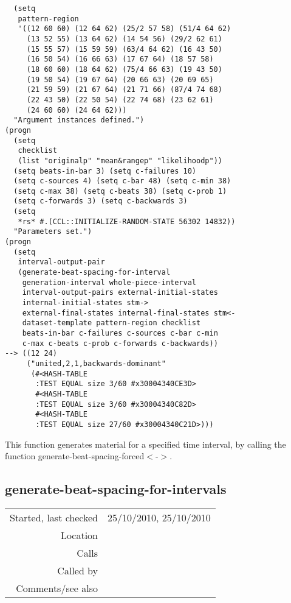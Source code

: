\begin{verbatim}
  (setq
   pattern-region
   '((12 60 60) (12 64 62) (25/2 57 58) (51/4 64 62)
     (13 52 55) (13 64 62) (14 54 56) (29/2 62 61)
     (15 55 57) (15 59 59) (63/4 64 62) (16 43 50)
     (16 50 54) (16 66 63) (17 67 64) (18 57 58)
     (18 60 60) (18 64 62) (75/4 66 63) (19 43 50)
     (19 50 54) (19 67 64) (20 66 63) (20 69 65)
     (21 59 59) (21 67 64) (21 71 66) (87/4 74 68)
     (22 43 50) (22 50 54) (22 74 68) (23 62 61)
     (24 60 60) (24 64 62)))
  "Argument instances defined.")
(progn
  (setq
   checklist
   (list "originalp" "mean&rangep" "likelihoodp"))
  (setq beats-in-bar 3) (setq c-failures 10)
  (setq c-sources 4) (setq c-bar 48) (setq c-min 38)
  (setq c-max 38) (setq c-beats 38) (setq c-prob 1)
  (setq c-forwards 3) (setq c-backwards 3)
  (setq
   *rs* #.(CCL::INITIALIZE-RANDOM-STATE 56302 14832))
  "Parameters set.")
(progn
  (setq
   interval-output-pair
   (generate-beat-spacing-for-interval
    generation-interval whole-piece-interval
    interval-output-pairs external-initial-states
    internal-initial-states stm->
    external-final-states internal-final-states stm<-
    dataset-template pattern-region checklist
    beats-in-bar c-failures c-sources c-bar c-min
    c-max c-beats c-prob c-forwards c-backwards))
--> ((12 24)
     ("united,2,1,backwards-dominant"
      (#<HASH-TABLE
       :TEST EQUAL size 3/60 #x30004340CE3D>
       #<HASH-TABLE
       :TEST EQUAL size 3/60 #x30004340C82D>
       #<HASH-TABLE
       :TEST EQUAL size 27/60 #x30004340C21D>)))
\end{verbatim}

\noindent This function generates material for a specified time
interval, by calling the function
generate-beat-spacing-forced$<$-$>$.


\subsection*{generate-beat-spacing-for-intervals}\label{fun:generate-beat-spacing-for-intervals}

\vspace{0.3cm}
\begin{tabular}{r|p{8cm}}
Started, last checked & 25/10/2010, 25/10/2010 \\
Location & \nameref{sec:generating-with-patterns} \\
Calls & \nameref{fun:generate-beat-spacing-for-interval} \\
Called by & \nameref{fun:generate-beat-spacing<->pattern-inheritance} \\
Comments/see also &
\end{tabular}

